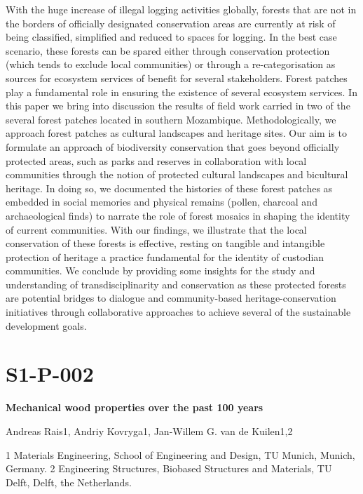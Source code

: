 \documentclass[
]{book}
\begin{document}
With the huge increase of illegal logging activities globally, forests
that are not in the borders of officially designated conservation areas
are currently at risk of being classified, simplified and reduced to
spaces for logging. In the best case scenario, these forests can be
spared either through conservation protection (which tends to exclude
local communities) or through a re-categorisation as sources for
ecosystem services of benefit for several stakeholders. Forest patches
play a fundamental role in ensuring the existence of several ecosystem
services. In this paper we bring into discussion the results of field
work carried in two of the several forest patches located in southern
Mozambique. Methodologically, we approach forest patches as cultural
landscapes and heritage sites. Our aim is to formulate an approach of
biodiversity conservation that goes beyond officially protected areas,
such as parks and reserves in collaboration with local communities
through the notion of protected cultural landscapes and bicultural
heritage. In doing so, we documented the histories of these forest
patches as embedded in social memories and physical remains (pollen,
charcoal and archaeological finds) to narrate the role of forest mosaics
in shaping the identity of current communities. With our findings, we
illustrate that the local conservation of these forests is effective,
resting on tangible and intangible protection of heritage a practice
fundamental for the identity of custodian communities. We conclude by
providing some insights for the study and understanding of
transdisciplinarity and conservation as these protected forests are
potential bridges to dialogue and community-based heritage-conservation
initiatives through collaborative approaches to achieve several of the
sustainable development goals.

\hypertarget{s1-p-002}{%
\section*{S1-P-002}\label{s1-p-002}}

\textbf{Mechanical wood properties over the past 100 years}

Andreas Rais1, Andriy Kovryga1, Jan-Willem G. van de Kuilen1,2

1 Materials Engineering, School of Engineering and Design, TU Munich,
Munich, Germany. 2 Engineering Structures, Biobased Structures and
Materials, TU Delft, Delft, the Netherlands.
\end{document}
